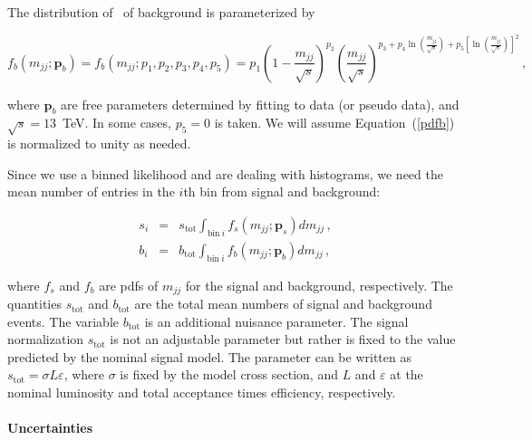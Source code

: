 
The distribution of \mjj~of background is parameterized by

\begin{equation}\label{pdfb}
f_b(m_{jj};\bm{p}_b) = f_b(m_{jj};p_1,p_2,p_3,p_4,p_5) = p_1 \left( 1
- \frac{m_{jj}}{\sqrt{s}} \right)^{p_2} \left( \frac{m_{jj}}{\sqrt{s}}
\right)^{p_3 + p_4\ln\left( \frac{m_{jj}}{\sqrt{s}} \right) +  p_5
  \left[ \ln \left( \frac{m_{jj}}{\sqrt{s}} \right) \right]^2}\, ,  
\end{equation}

\noindent
where $\bm{p}_b$ are free parameters determined by fitting to data (or 
pseudo data), and $\sqrt{s} = 13$~TeV.
In some cases, $p_5 = 0$ is taken. 
We will assume Equation~(\ref{pdfb}) is normalized to unity as needed.

Since we use a binned likelihood and are dealing with histograms,
we need the mean number of entries in the $i$th bin from signal and
background:

\begin{eqnarray}
s_i & = & s_\mathrm{tot} \int_{\mathrm{bin}\ i} f_s(m_{jj};\bm{p}_s)
dm_{jj}\, ,\\
b_i & = & b_\mathrm{tot} \int_{\mathrm{bin}\ i} f_b(m_{jj};\bm{p}_b) dm_{jj}\, ,
\end{eqnarray}

\noindent
where $f_s$ and $f_b$ are pdfs of $m_{jj}$ for the signal and
background, respectively. 
The quantities $s_\mathrm{tot}$ and $b_\mathrm{tot}$ are the total mean
numbers of signal and background events.
The variable $b_\mathrm{tot}$ is an additional nuisance parameter.
The signal normalization $s_\mathrm{tot}$ is not an adjustable parameter
but rather is fixed to the value predicted by the nominal signal model.
The parameter can be written as $s_\mathrm{tot} = \sigma L \varepsilon$,
where $\sigma$ is fixed by the model cross section, and $L$ and
$\varepsilon$ at the nominal luminosity and total acceptance times
efficiency, respectively.


\paragraph{Uncertainties\\}

